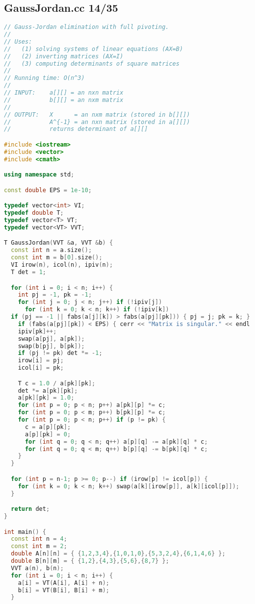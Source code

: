 \subsection{GaussJordan.cc 14/35}
\begin{lstlisting}[language=C++]
// Gauss-Jordan elimination with full pivoting.
//
// Uses:
//   (1) solving systems of linear equations (AX=B)
//   (2) inverting matrices (AX=I)
//   (3) computing determinants of square matrices
//
// Running time: O(n^3)
//
// INPUT:    a[][] = an nxn matrix
//           b[][] = an nxm matrix
//
// OUTPUT:   X      = an nxm matrix (stored in b[][])
//           A^{-1} = an nxn matrix (stored in a[][])
//           returns determinant of a[][]

#include <iostream>
#include <vector>
#include <cmath>

using namespace std;

const double EPS = 1e-10;

typedef vector<int> VI;
typedef double T;
typedef vector<T> VT;
typedef vector<VT> VVT;

T GaussJordan(VVT &a, VVT &b) {
  const int n = a.size();
  const int m = b[0].size();
  VI irow(n), icol(n), ipiv(n);
  T det = 1;

  for (int i = 0; i < n; i++) {
    int pj = -1, pk = -1;
    for (int j = 0; j < n; j++) if (!ipiv[j])
      for (int k = 0; k < n; k++) if (!ipiv[k])
  if (pj == -1 || fabs(a[j][k]) > fabs(a[pj][pk])) { pj = j; pk = k; }
    if (fabs(a[pj][pk]) < EPS) { cerr << "Matrix is singular." << endl; exit(0); }
    ipiv[pk]++;
    swap(a[pj], a[pk]);
    swap(b[pj], b[pk]);
    if (pj != pk) det *= -1;
    irow[i] = pj;
    icol[i] = pk;

    T c = 1.0 / a[pk][pk];
    det *= a[pk][pk];
    a[pk][pk] = 1.0;
    for (int p = 0; p < n; p++) a[pk][p] *= c;
    for (int p = 0; p < m; p++) b[pk][p] *= c;
    for (int p = 0; p < n; p++) if (p != pk) {
      c = a[p][pk];
      a[p][pk] = 0;
      for (int q = 0; q < n; q++) a[p][q] -= a[pk][q] * c;
      for (int q = 0; q < m; q++) b[p][q] -= b[pk][q] * c;      
    }
  }

  for (int p = n-1; p >= 0; p--) if (irow[p] != icol[p]) {
    for (int k = 0; k < n; k++) swap(a[k][irow[p]], a[k][icol[p]]);
  }

  return det;
}

int main() {
  const int n = 4;
  const int m = 2;
  double A[n][n] = { {1,2,3,4},{1,0,1,0},{5,3,2,4},{6,1,4,6} };
  double B[n][m] = { {1,2},{4,3},{5,6},{8,7} };
  VVT a(n), b(n);
  for (int i = 0; i < n; i++) {
    a[i] = VT(A[i], A[i] + n);
    b[i] = VT(B[i], B[i] + m);
  }
  

\end{lstlisting}
